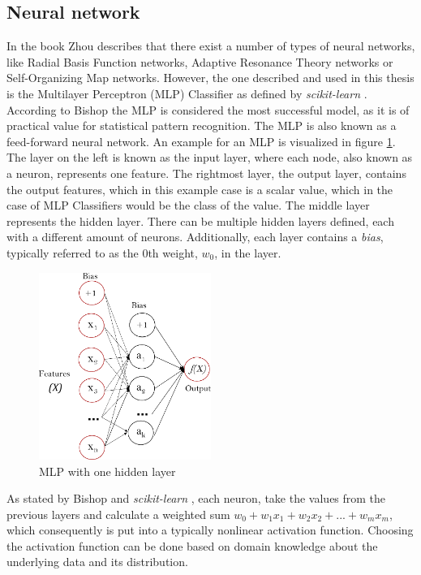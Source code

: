 \subsection{Neural network}
In the book \parencite{zhou2021machine} Zhou describes that there exist a number of types of neural networks, like Radial Basis Function networks, Adaptive Resonance Theory networks or Self-Organizing Map networks. However, the one described and used in this thesis is the Multilayer Perceptron (MLP) Classifier as defined by \textit{scikit-learn} \parencite{117Neura38:online}. According to Bishop \parencite{bishopML} the MLP is considered the most successful model, as it is of practical value for statistical pattern recognition. The MLP is also known as a feed-forward neural network. An example for an MLP is visualized in figure \ref{fig:mlp_sample}. The layer on the left is known as the input layer, where each node, also known as a neuron, represents one feature. The rightmost layer, the output layer, contains the output features, which in this example case is a scalar value, which in the case of MLP Classifiers would be the class of the value. The middle layer represents the hidden layer. There can be multiple hidden layers defined, each with a different amount of neurons. Additionally, each layer contains a \textit{bias}, typically referred to as the $0$th weight, $w_0$, in the layer. 
\begin{figure}[h]
      \centering
      \includegraphics[width=0.5\textwidth]{images/mlp_example.png}
      \caption{MLP with one hidden layer \parencite{117Neura38:online} }
      \label{fig:mlp_sample}
  \end{figure}
As stated by Bishop \parencite{bishopML} and \textit{scikit-learn} \parencite{117Neura38:online}, each neuron, take the values from the previous layers and calculate a weighted sum $w_0 + w_1x_1 + w_2x_2 + ... + w_mx_m$, which consequently is put into a typically nonlinear activation function. Choosing the activation function can be done based on domain knowledge about the underlying data and its distribution.
